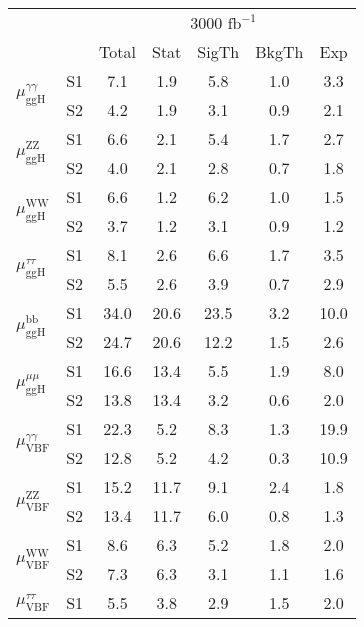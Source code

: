 \begin{tabular}{@{} l c c@{\hskip 0.15in} c c c c @{}}
 \hline
  &  & \multicolumn{5}{c}{3000 $\text{fb}^{-1}$} \\
  &  & Total & Stat & SigTh & BkgTh & Exp \\
 \hline
\multirow{2}{*}{$\mu_{\mathrm{ggH}}^{\gamma \gamma }$} & S1  & 7.1& 1.9 & 5.8 & 1.0 & 3.3  \\[1pt]
                        & S2  & 4.2& 1.9 & 3.1 & 0.9 & 2.1  \\[4pt]
\multirow{2}{*}{$\mu_{\mathrm{ggH}}^{\mathrm{ZZ}}$} & S1  & 6.6& 2.1 & 5.4 & 1.7 & 2.7  \\[1pt]
                        & S2  & 4.0& 2.1 & 2.8 & 0.7 & 1.8  \\[4pt]
\multirow{2}{*}{$\mu_{\mathrm{ggH}}^{\mathrm{WW}}$} & S1  & 6.6& 1.2 & 6.2 & 1.0 & 1.5  \\[1pt]
                        & S2  & 3.7& 1.2 & 3.1 & 0.9 & 1.2  \\[4pt]
\multirow{2}{*}{$\mu_{\mathrm{ggH}}^{\tau \tau }$} & S1  & 8.1& 2.6 & 6.6 & 1.7 & 3.5  \\[1pt]
                        & S2  & 5.5& 2.6 & 3.9 & 0.7 & 2.9  \\[4pt]
\multirow{2}{*}{$\mu_{\mathrm{ggH}}^{\mathrm{bb}}$} & S1  & 34.0& 20.6 & 23.5 & 3.2 & 10.0  \\[1pt]
                        & S2  & 24.7& 20.6 & 12.2 & 1.5 & 2.6  \\[4pt]
\multirow{2}{*}{$\mu_{\mathrm{ggH}}^{\mu \mu }$} & S1  & 16.6& 13.4 & 5.5 & 1.9 & 8.0  \\[1pt]
                        & S2  & 13.8& 13.4 & 3.2 & 0.6 & 2.0  \\[4pt]
\multirow{2}{*}{$\mu_{\mathrm{VBF}}^{\gamma \gamma }$} & S1  & 22.3& 5.2 & 8.3 & 1.3 & 19.9  \\[1pt]
                        & S2  & 12.8& 5.2 & 4.2 & 0.3 & 10.9  \\[4pt]
\multirow{2}{*}{$\mu_{\mathrm{VBF}}^{\mathrm{ZZ}}$} & S1  & 15.2& 11.7 & 9.1 & 2.4 & 1.8  \\[1pt]
                        & S2  & 13.4& 11.7 & 6.0 & 0.8 & 1.3  \\[4pt]
\multirow{2}{*}{$\mu_{\mathrm{VBF}}^{\mathrm{WW}}$} & S1  & 8.6& 6.3 & 5.2 & 1.8 & 2.0  \\[1pt]
                        & S2  & 7.3& 6.3 & 3.1 & 1.1 & 1.6  \\[4pt]
\multirow{2}{*}{$\mu_{\mathrm{VBF}}^{\tau \tau }$} & S1  & 5.5& 3.8 & 2.9 & 1.5 & 2.0  \\[1pt]

\end{tabular}
